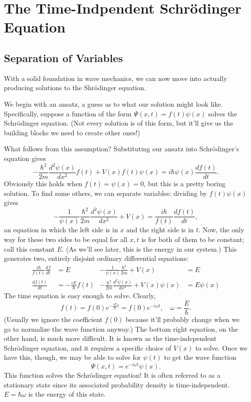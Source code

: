 \documentclass[../p052main.tex]{subfiles}
\begin{document}
\chapter{The Time-Indpendent Schrödinger Equation}
\section{Separation of Variables}
With a solid foundation in wave mechanics, we can now move into actually producing solutions to the Shrödinger equation.

We begin with an ansatz, a guess as to what our solution might look like.
Specifically, suppose a function of the form $\Psi(x,t) = f(t) \psi(x)$ solves the Schrödinger equation.
(Not every solution is of this form, but it'll give us the building blocks we need to create other ones!)

What follows from this assumption?
Substituting our ansatz into Schrödinger's equation gives
\[ -\frac{\hbar^2}{2m} \frac{d^2 \psi(x)}{dx^2} f(t) + V(x)f(t)\psi(x) = i\hbar \psi(x) \frac{df(t)}{dt}. \]
Obviously this holds when $f(t) = \psi(x) = 0$, but this is a pretty boring solution.
To find some others, we can separate variables: dividing by $f(t)\psi(x)$ gives
\[ -\frac{1}{\psi(x)}\frac{\hbar^2}{2m} \frac{d^2 \psi(x)}{dx^2} + V(x) = \frac{i\hbar}{f(t)} \frac{df(t)}{dt}, \]
an equation in which the left side is in $x$ and the right side is in $t$.
Now, the only way for these two sides to be equal for all $x,t$ is for both of them to be constant; call this constant $E$.
(As we'll see later, this is the energy in our system.)
This generates two, entirely disjoint ordinary differential equations:
\begin{align*}
    \frac{i\hbar}{f(t)}\frac{df}{dt} &= E & -\frac{1}{\psi(x)}\frac{\hbar^2}{2m} + V(x) &= E \\
    \frac{df(t)}{dt} &= -\frac{iE}{\hbar} f(t) & -\frac{\hbar^2}{2m} \frac{d^2 \psi(x)}{dx^2} + V(x) \psi(x) &= E \psi (x)
\end{align*}
The time equation is easy enough to solve.
Clearly,
\[ f(t) = f(0) e^{-\frac{iE}{\hbar}t} = f(0) e^{-i \omega t}, \quad \omega = \frac{E}{\hbar}. \]
(Usually we ignore the coefficient $f(0)$ because it'll probably change when we go to normalize the wave function anyway.)
The bottom right equation, on the other hand, is much more difficult.
It is known as the time-independent Schrödinger equation, and it requires a specific choice of $V(x)$ to solve.
Once we have this, though, we may be able to solve for $\psi(t)$ to get the wave function
\[ \Psi(x,t) = e^{-i \omega t} \psi(x). \]
This function solves the Schrödinger equation!
It is often referred to as a stationary state since its associated probability density is time-independent.
$E = \hbar \omega$ is the energy of this state.
\end{document}
